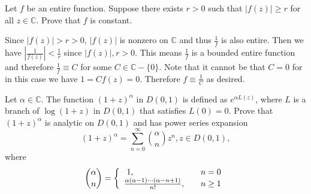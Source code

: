 \documentclass{article}
\newcounter{Problem}
\newenvironment{Problem}{\begin{Exercise}[name={Problem},
                                          counter={Problem}]}
                        {\end{Exercise}}
\begin{document}
\begin{Problem}
Let $f$ be an entire function. Suppose there exists $r > 0$ such that
$|f(z)| \geq r$ for all $z \in \mathbb{C}$. Prove that $f$ is constant.
\end{Problem}

\begin{Answer}
Since $|f(z)| > r > 0$, $|f(z)|$ is nonzero on $\mathbb{C}$ and thus
$\frac{1}{f}$ is also entire. Then we have
$\left|\frac{1}{f(z)}\right| < \frac{1}{r}$ since $|f(z)|, r > 0$.
This means $\frac{1}{f}$ is a bounded entire function and therefore
$\frac{1}{f} \equiv C$ for some $C \in \mathbb{C} - \{ 0 \}$.
Note that it cannot be that $C = 0$ for in this case we have 
$1 = C f(z) = 0$. Therefore $f \equiv \frac{1}{C}$ as desired.
\end{Answer}

\begin{Problem}
Let $\alpha \in \mathbb{C}$. The function $(1 + z)^\alpha$ in
$D(0, 1)$ is defined as $e^{\alpha L(z)}$, where $L$ is a branch of
$\log (1 + z)$ in $D(0, 1)$ that satisfies $L(0) = 0$.
Prove that $(1 + z)^\alpha$ is analytic on $D(0, 1)$ and has
power series expansion
$$
(1 + z)^\alpha = \sum_{n=0}^\infty {\alpha \choose n} z^n, z \in D(0, 1),
$$
where
$$
{\alpha \choose n} =
\left\{\begin{array}{l l}\
  1,                                                     & \quad n = 0 \\
  \frac{\alpha(\alpha - 1) \cdots (\alpha - n + 1)}{n!}, & \quad n \geq 1
\end{array}\right.
$$
\end{Problem}
\end{document}
